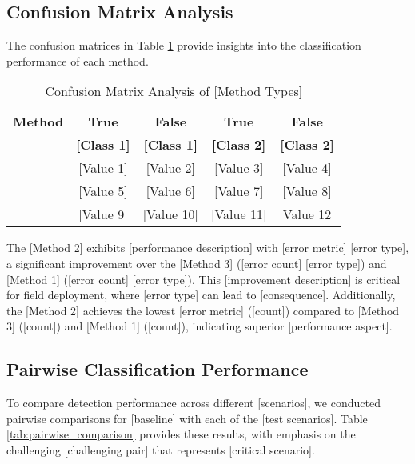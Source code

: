 \subsection{Confusion Matrix Analysis}

The confusion matrices in Table \ref{tab:confusion_matrix} provide insights into the classification performance of each method.

\begin{table}[htbp]
\caption{Confusion Matrix Analysis of [Method Types]}
\label{tab:confusion_matrix}
\begin{tabular}{|l|c|c|c|c|}
\hline
\textbf{Method} & \textbf{True} & \textbf{False} & \textbf{True} & \textbf{False} \\
& \textbf{[Class 1]} & \textbf{[Class 1]} & \textbf{[Class 2]} & \textbf{[Class 2]} \\
\hline
[Method 2] & [Value 1] & [Value 2] & [Value 3] & [Value 4] \\
\hline
[Method 1] & [Value 5] & [Value 6] & [Value 7] & [Value 8] \\
\hline
[Method 3] & [Value 9] & [Value 10] & [Value 11] & [Value 12] \\
\hline
\end{tabular}
\end{table}

The [Method 2] exhibits [performance description] with [error metric] [error type], a significant improvement over the [Method 3] ([error count] [error type]) and [Method 1] ([error count] [error type]). This [improvement description] is critical for field deployment, where [error type] can lead to [consequence]. Additionally, the [Method 2] achieves the lowest [error metric] ([count]) compared to [Method 3] ([count]) and [Method 1] ([count]), indicating superior [performance aspect].

\subsection{Pairwise Classification Performance}

To compare detection performance across different [scenarios], we conducted pairwise comparisons for [baseline] with each of the [test scenarios]. Table \ref{tab:pairwise_comparison} provides these results, with emphasis on the challenging [challenging pair] that represents [critical scenario].

